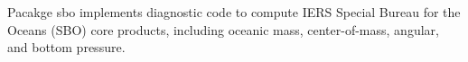 
Pacakge sbo implements diagnostic code to compute IERS
Special Bureau for the Oceans (SBO) core products, including oceanic mass,
center-of-mass, angular, and bottom pressure. 
